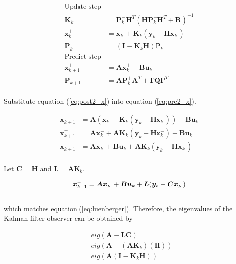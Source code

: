 \documentclass[10pt,conference,compsoc]{IEEEtran}
\newcommand{\mtx}[1] {\bm #1}
\begin{document}
\begin{align}
  \text{Update step} \nonumber \\
  \mtx{K}_k &= \mtx{P}_k^- \mtx{H}^T (\mtx{H}\mtx{P}_k^- \mtx{H}^T +
    \mtx{R})^{-1} \\
  \mtx{x}_k^+ &= \mtx{x}_k^- + \mtx{K}_k (\mtx{y}_k - \mtx{H} \mtx{x}_k^-)
    \label{eq:post2_x} \\
  \mtx{P}_k^+ &= (\mtx{I} - \mtx{K}_k\mtx{H})\mtx{P}_k^- \\
  \text{Predict step} \nonumber \\
  \mtx{x}_{k+1}^+ &= \mtx{A} \mtx{x}_k^+ + \mtx{B} \mtx{u}_k
    \label{eq:pre2_x} \\
  \mtx{P}_{k+1}^- &= \mtx{A} \mtx{P}_k^+ \mtx{A}^T +
    \mtx{\Gamma}\mtx{Q}\mtx{\Gamma}^T
\end{align}
\\
\noindent Substitute equation (\ref{eq:post2_x}) into equation
(\ref{eq:pre2_x}).

\begin{align*}
  \mtx{x}_{k+1}^+ &= \mtx{A} (\mtx{x}_k^- +
    \mtx{K}_k (\mtx{y}_k - \mtx{H} \mtx{x}_k^-)) + \mtx{B} \mtx{u}_k \\
  \mtx{x}_{k+1}^+ &= \mtx{A} \mtx{x}_k^- +
    \mtx{A} \mtx{K}_k (\mtx{y}_k - \mtx{H} \mtx{x}_k^-) + \mtx{B} \mtx{u}_k \\
  \mtx{x}_{k+1}^+ &= \mtx{A} \mtx{x}_k^- + \mtx{B} \mtx{u}_k +
    \mtx{A} \mtx{K}_k (\mtx{y}_k - \mtx{H} \mtx{x}_k^-) \\
\end{align*}

\noindent Let $\mtx{C} = \mtx{H}$ and $\mtx{L} = \mtx{A} \mtx{K}_k$.

\begin{equation} \label{eq:app_kalman_leunberger}
  \mtx{x}_{k+1}^+ = \mtx{A} \mtx{x}_k^- + \mtx{B} \mtx{u}_k +
    \mtx{L} (\mtx{y}_k - \mtx{C} \mtx{x}_k^-) \\
\end{equation}
\\
\noindent which matches equation (\ref{eq:luenberger}). Therefore,
the eigenvalues of the Kalman filter observer can be obtained by

\begin{align}
  &eig(\mtx{A} - \mtx{L}\mtx{C}) \nonumber \\
  &eig(\mtx{A} - (\mtx{A}\mtx{K}_k)(\mtx{H})) \nonumber \\
  &eig(\mtx{A}(\mtx{I} - \mtx{K}_k\mtx{H}))
\end{align}
\end{document}
